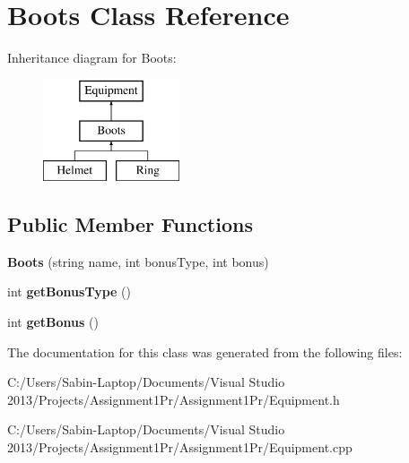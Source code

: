\hypertarget{class_boots}{}\section{Boots Class Reference}
\label{class_boots}
Inheritance diagram for Boots\+:\begin{figure}[H]
\begin{center}
\leavevmode
\includegraphics[height=3.000000cm]{class_boots}
\end{center}
\end{figure}
\subsection*{Public Member Functions}
\begin{DoxyCompactItemize}
\item 
\hypertarget{class_boots_a0907abf1f378cc9ed38f5227ed7a2659}{}\label{class_boots_a0907abf1f378cc9ed38f5227ed7a2659} 
{\bfseries Boots} (string name, int bonus\+Type, int bonus)
\item 
\hypertarget{class_boots_a13df6e31fe7fe29ad02d6bd1ff549083}{}\label{class_boots_a13df6e31fe7fe29ad02d6bd1ff549083} 
int {\bfseries get\+Bonus\+Type} ()
\item 
\hypertarget{class_boots_a5fe25ec5751efe1d6bc96618fb447a89}{}\label{class_boots_a5fe25ec5751efe1d6bc96618fb447a89} 
int {\bfseries get\+Bonus} ()
\end{DoxyCompactItemize}


The documentation for this class was generated from the following files\+:\begin{DoxyCompactItemize}
\item 
C\+:/\+Users/\+Sabin-\/\+Laptop/\+Documents/\+Visual Studio 2013/\+Projects/\+Assignment1\+Pr/\+Assignment1\+Pr/Equipment.\+h\item 
C\+:/\+Users/\+Sabin-\/\+Laptop/\+Documents/\+Visual Studio 2013/\+Projects/\+Assignment1\+Pr/\+Assignment1\+Pr/Equipment.\+cpp\end{DoxyCompactItemize}
